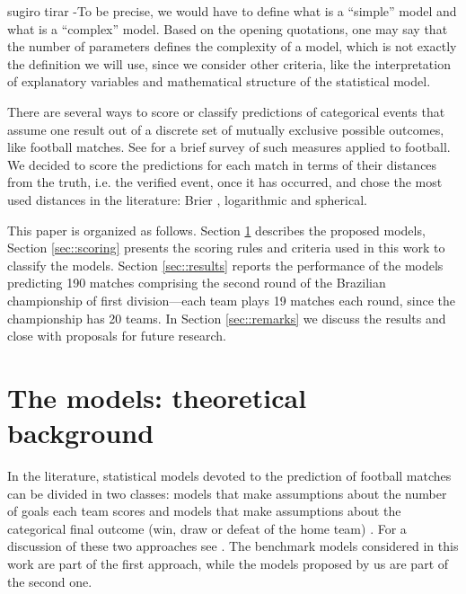 \documentclass[journal,article,accept,moreauthors,pdftex,12pt,a4paper]{mdpi}
\begin{document}
	{\color{red}sugiro tirar -To be precise, we would have to define what is a ``simple'' model and what is a ``complex'' model. Based on the opening quotations, one may say that the number of parameters defines the complexity of a model, which is not exactly the definition we will use, since we consider other criteria, like the interpretation of explanatory variables and mathematical structure of the statistical model.}
	
	
	There are several ways to score or classify predictions of categorical events that assume one result out of a discrete set of mutually exclusive possible outcomes, like football matches.
	See \cite{constantinou} for a brief survey of such measures applied to football.
	We decided to score the predictions for each match in terms of their distances from the truth, i.e. the verified event, once it has occurred, and chose the most used distances in the literature: Brier \cite{brier1950}, logarithmic and spherical.
	
	This paper is organized as follows.
	Section \ref{sec::experimental} describes the proposed models, Section \ref{sec::scoring} presents the scoring rules and criteria used in this work to classify the models.
	Section \ref{sec::results} reports the performance of the models predicting 190 matches comprising the second round of the Brazilian championship of first division---each team plays 19 matches each round, since the championship has 20 teams.
	In Section \ref{sec::remarks} we discuss the results and close with proposals for future research.
	
	
	
	\section{The models: theoretical background}
	\label{sec::experimental}
	
	In the literature, statistical models devoted to the prediction of
	football matches can be divided in two classes: models that make
	assumptions about the number of goals each team scores
	\citep{Maher82, Dixon97, Lee97, Karlis2003} and models that make
	assumptions about the categorical final outcome (win, draw or defeat
	of the home team) \citep{Forrest2000, Koning2000, Brillinger2008,
		Brillinger2009}. For a discussion of these two approaches see
	\cite{Goddard2005}. The benchmark models considered in this work are
	part of the first approach, while the models proposed by us are part
	of the second one.
	
\end{document}
